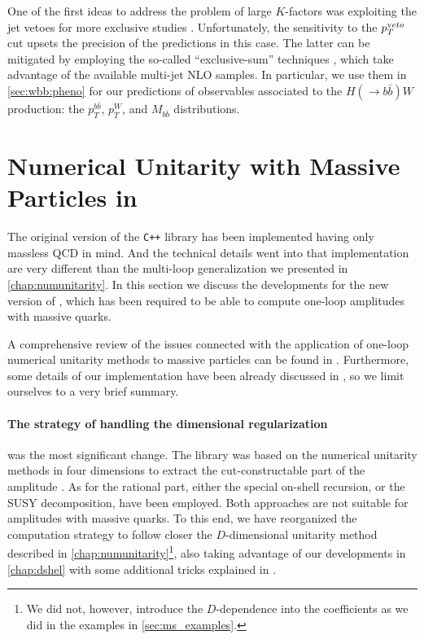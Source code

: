 One of the first ideas to address the problem of large $K$-factors was exploiting the jet vetoes 
for more exclusive studies \cite{FebresCordero:2006sj}.
Unfortunately, the sensitivity to the $p_T^{\textrm veto}$ cut upsets
the precision  of the predictions in this case.
The latter can be mitigated by employing the so-called ``exclusive-sum'' techniques \cite{ESums},
which take advantage of the available multi-jet NLO samples.
In particular, we use them in \cref{sec:wbb:pheno} for our predictions of observables associated to the  $H(\rightarrow b{\bar b})W$ 
production: the $p_T^{b\bar b}$, $p_T^W$, and $M_{b\bar b}$ distributions.


\section{Numerical Unitarity with Massive Particles in \BlackHat{}}
\label{sec:BHMassiveImpl}

The original version of the \texttt{C++} library \BlackHat{} \cite{Berger:2008sj,Berger:2008ag} has been
implemented having only massless QCD in mind. 
And the technical details went into that implementation are very different than
the multi-loop generalization we presented in \cref{chap:numunitarity}.
In this section we discuss the developments for the new version of \BlackHat{},
which has been required to be able to compute one-loop amplitudes with massive quarks.

A comprehensive review of the issues connected with the application of
one-loop numerical unitarity methods to massive particles can be found in \cite{Ellis:2011cr,Ellis:2008ir}.
Furthermore, some details of our implementation have been already discussed in \cite{FelixDiss},
so we limit ourselves to a very brief summary.

\paragraph{The strategy of handling the dimensional regularization}
was the most significant change.
The \BlackHat{} library was based on the numerical unitarity methods in four dimensions to extract the cut-constructable part
of the amplitude \cite{Ita:2011hi,Berger:2008sj,Berger:2008ag}. As for the rational part, either the special on-shell recursion, or the SUSY decomposition, have been employed.
Both approaches are not suitable for amplitudes with massive quarks.
To this end, we have reorganized the computation strategy to follow closer the $D$-dimensional unitarity method described in \cref{chap:numunitarity}\footnote{
  We did not, however, introduce the $D$-dependence into the coefficients as we did in the examples in \cref{sec:ms_examples}.
},
also taking advantage of our developments in \cref{chap:dshel} with some additional tricks explained in \cite{Anger:2018ove}.

